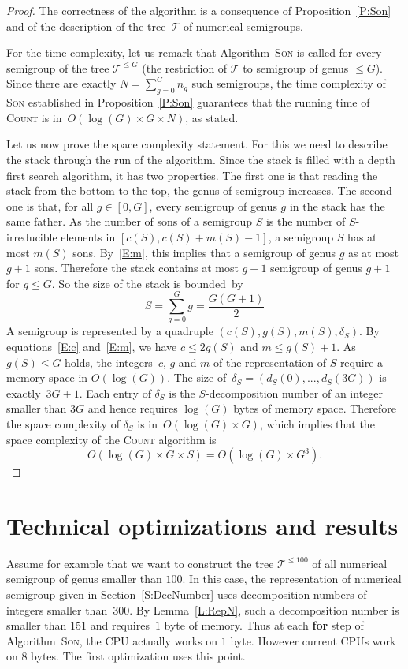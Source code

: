 \documentclass[reqno,11pt]{amsart}
\theoremstyle{plain}
\theoremstyle{definition}
\renewcommand{\leq}{\leqslant}
\begin{document}
\begin{proof}
The correctness of the algorithm is a consequence of Proposition~\ref{P:Son} and of the description of the tree~$\mathcal{T}$ of numerical semigroups.

For the time complexity, let us remark that Algorithm~\textsc{Son} is called for every semigroup of the tree $\mathcal{T}^{\leq G}$ (the restriction of $\mathcal{T}$ to semigroup of genus $\leq G$). 
Since there are exactly $N=\sum_{g=0}^G n_g$ such semigroups, the time complexity of \textsc{Son} established in Proposition~\ref{P:Son} guarantees that the running time of \textsc{Count} is in~$O(\log(G)\times G\times N)$, as stated.

Let us now prove the space complexity statement.
For  this we need to describe the stack through  the run of the algorithm.
Since the stack is filled  with a depth first search algorithm, it has two properties.
The first one is that reading the stack from the bottom to the top, the genus of  semigroup increases.  
The second one is that, for all $g\in[0,G]$, every semigroup of genus $g$ in the stack has the same father.
As the number of sons of a  semigroup $S$ is the number of $S$-irreducible elements in $[c(S),c(S)+m(S)-1]$,  a semigroup $S$ has at most $m(S)$ sons. 
By~\eqref{E:m}, this implies that a semigroup of genus $g$ as at most $g+1$ sons.
Therefore the stack contains at most $g+1$ semigroup of genus $g+1$ for $g\leq G$. 
So the size of the stack is bounded~by 
\[
S=\sum_{g=0}^Gg=\frac{G(G+1)}2
\]
A semigroup is represented by a quadruple $(c(S),g(S),m(S),\delta_S)$. 
By equations~\eqref{E:c} and~\eqref{E:m}, we have $c\leq 2g(S)$ and $m\leq g(S)+1$. 
As $g(S)\leq G$ holds, the integers~$c$, $g$  and $m$ of the representation of $S$ require a memory space in $O(\log(G))$. 
The size of~$\delta_S=(d_S(0),...,d_S(3G))$ is exactly~$3G+1$. 
Each entry of $\delta_S$ is the $S$-decomposition number of an integer smaller than $3G$ and hence
requires $\log(G)$ bytes of memory space.
Therefore the space complexity of $\delta_S$ is in~$O(\log(G)\times G)$, which implies that the space complexity of the \textsc{Count} algorithm is
\[
O(\log(G)\times G\times S)= O(\log(G)\times G^3).
\]
\end{proof}

\section{Technical optimizations and results}
\label{S:Opti}

Assume for example that we want to construct the tree $\mathcal{T}^{\leq 100}$ of all  numerical semigroup of  genus smaller than $100$. 
In this case, the representation of  numerical  semigroup given in Section~\ref{S:DecNumber} uses decomposition numbers of integers smaller than~$300$.
By Lemma~\ref{L:RepN}, such a decomposition number is smaller than $151$ and requires~$1$ byte of memory.
Thus at each \textbf{for} step of Algorithm~\textsc{Son}, the CPU actually works on $1$ byte. 
However current CPUs work on $8$ bytes.
The first optimization uses this point.
\end{document}
